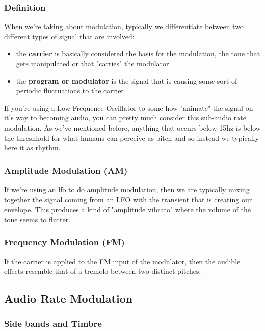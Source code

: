 \documentclass[11pt]{article}
\begin{document}
\subsubsection{Definition}
\label{sec:org7877afb}
When we're taking about modulation, typically we differentiate between
two different types of signal that are involved:

\begin{itemize}
\item the \textbf{carrier} is basically considered the basis for the modulation,
the tone that gets manipulated or that "carries" the modulator
\item the \textbf{program or modulator} is the signal that is causing some sort of
periodic fluctuations to the carrier
\end{itemize}

If you're using a Low Frequence Oscillator to some how "animate" the
signal on it's way to becoming audio, you can pretty much consider
this sub-audio rate modulation. As we've mentioned before, anything
that occurs below 15hz is below the threshhold for what humans can
perceive as pitch and so instead we typically here it as rhythm. 

\subsubsection{Amplitude Modulation (AM)}
\label{sec:org1e9513f}
If we're using an lfo to do amplitude modulation, then we are
typically mixing together the signal coming from an LFO with the
transient that is creating our envelope. This produces a kind of
"amplitude vibrato" where the volume of the tone seems to flutter. 

\subsubsection{Frequency Modulation (FM)}
\label{sec:orgb0d9c3e}
If the carrier is applied to the FM input of the modulator, then the
audible effects resemble that of a tremolo between two distinct
pitches.

\subsection{Audio Rate Modulation}
\label{sec:org74b2e6e}
\subsubsection{Side bands and Timbre}
\label{sec:orgb9f522e}
\end{document}
